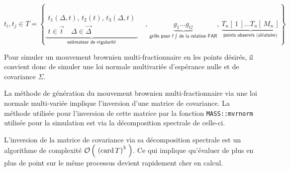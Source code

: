 \begin{equation*}
t_i, t_j \in 
T = \left\{
		\underbrace{
\begin{array}{c}
t_1(\Delta, t), \, t_2(t), \, t_3(\Delta, t )
\\
t \in \vec t \quad \Delta \in \overrightarrow \Delta
\end{array}
		}_{
			\textsf{estimateur de régularité}
		}
	  \quad , \,
	  \underbrace{
	  g_1 \dots g_G
	  }_{
		\textsf{grille pour l'} \int \textsf{ de la relation FAR} 
	  }
	  , \,
	  \underbrace{
	  	T_n[\,1\,] \dots T_n[\,M_n\,]
	  }_{
		\textsf{points observés (aléatoire)}
	  }
\right\}
\end{equation*}

Pour simuler un mouvement brownien multi-fractionnaire en les points désirés, il convient donc de simuler une loi normale multivariée d'espérance nulle et de covariance $\Sigma$.

\begin{rem}
	La méthode de génération du mouvement brownien multi-fractionnaire via une loi normale multi-variée implique l'inversion d'une matrice de covariance. La méthode utilisée pour l'inversion de cette matrice par la fonction \texttt{MASS::mvrnorm} utilisée pour la simulation est via la décomposition spectrale de celle-ci.
	
	L'inversion de la matrice de covariance via sa décomposition spectrale est un algorithme de complexité ${\mathcal O} \left( \ {(\operatorname{card}T)}^3 \ \right)$. Ce qui implique qu'évaluer de plus en plus de point sur le même processus devient rapidement cher en calcul.
	\label{rem:inversion_matrice_covariance_mfbm_informel}
\end{rem}
